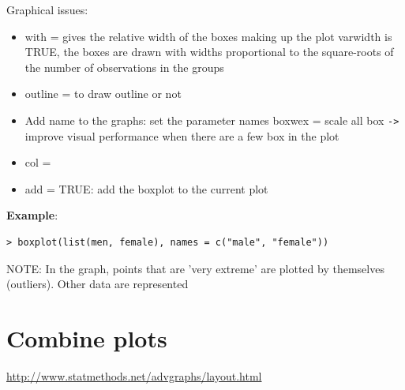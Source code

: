 Graphical issues:
\begin{itemize}
\item with = gives the relative width of the boxes making up the plot
varwidth is TRUE, the boxes are drawn with widths proportional to the
square-roots of the number of observations in the groups 

\item outline = to draw outline or not 

\item Add name to the graphs: set the parameter names
boxwex = scale all box \verb|->| improve visual performance when there
are a few box in the plot 

\item col = 

\item add = TRUE: add the boxplot to the current plot

\end{itemize}

{\bf Example}: 
\begin{lstlisting}
> boxplot(list(men, female), names = c("male", "female"))
\end{lstlisting}

NOTE: In the graph, points that are 'very extreme' are plotted by
themselves (outliers). Other data are represented


\section{Combine plots}
\label{sec:combine-plots}

\url{http://www.statmethods.net/advgraphs/layout.html}

